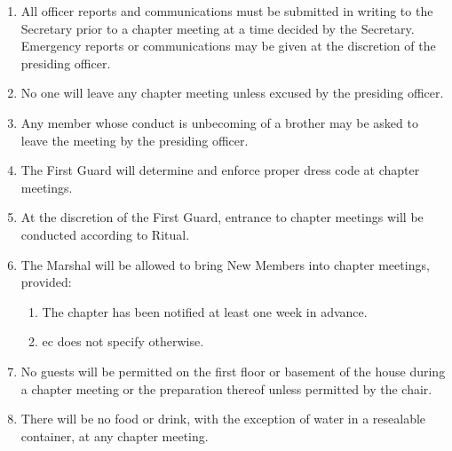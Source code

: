 	\begin{enumerate}
		\item All officer reports and communications must be submitted in writing to the Secretary prior to a chapter meeting at a time decided by the Secretary. Emergency reports or communications may be given at the discretion of the presiding officer.
		\item No one will leave any chapter meeting unless excused by the presiding officer.

		\item Any member whose conduct is unbecoming of a brother may be asked to leave the meeting by the presiding officer.

		\item The First Guard will determine and enforce proper dress code at chapter meetings. \label{chapter-dress}

		\item At the discretion of the First Guard, entrance to chapter meetings will be conducted according to Ritual.

		\item The Marshal will be allowed to bring New Members into chapter meetings, provided:

			\begin{enumerate}

				\item The chapter has been notified at least one week in advance.

				\item \Gls{ec} does not specify otherwise.

			\end{enumerate}

		\item No guests will be permitted on the first floor or basement of the house during a chapter meeting or the preparation thereof unless permitted by the chair.
		
        \item There will be no food or drink, with the exception of water in a resealable container, at any chapter meeting.

	\end{enumerate}
